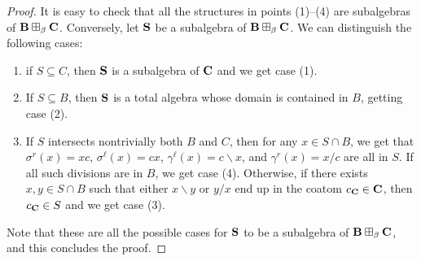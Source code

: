 \documentclass{amsart}
\theoremstyle{definition}
\numberwithin{equation}{section}
\newcommand{\alg}[1]{{\textbf{\upshape #1}}}  %
\newcommand{\sell}{\sigma^\ell}
\newcommand{\sr}{\sigma^r}
\newcommand{\gell}{\gamma^\ell}
\newcommand{\gr}{\gamma^r}
\begin{document}
\begin{proof}
It is easy to check that all the structures in points (1)--(4) are subalgebras of $\alg B \boxplus_\beta \alg C$. Conversely, let $\alg S$ be a subalgebra of $\alg B \boxplus_\beta \alg C$. We can distinguish the following cases: 
\begin{enumerate}
	\item if $S \subseteq C$, then $\alg S$ is a subalgebra of $\alg C$ and we get case (1). 
	\item If $S \subseteq B$, then $\alg S$ is a total algebra whose domain is contained in $B$, getting case (2). 
	\item If $S$ intersects nontrivially both $B$ and $C$, then for any $x \in S \cap B$, we get that $\sr(x) = xc$, $\sell(x) = cx$, $\gell(x) = c \backslash x$, and $\gr(x) = x / c$ are all in $S$. If all such divisions are in $B$, we get case (4). Otherwise, if there exists $x, y \in S \cap B$ such that either $x \backslash y$ or $y / x$ end up in the coatom $c_\alg C \in \alg C$, then $c_\alg C \in S$ and we get case (3).
\end{enumerate}

Note that these are all the possible cases for $\alg S$ to be a subalgebra of $\alg B \boxplus_{\beta}  \alg C$, and this concludes the proof.  
\end{proof}
\end{document}
